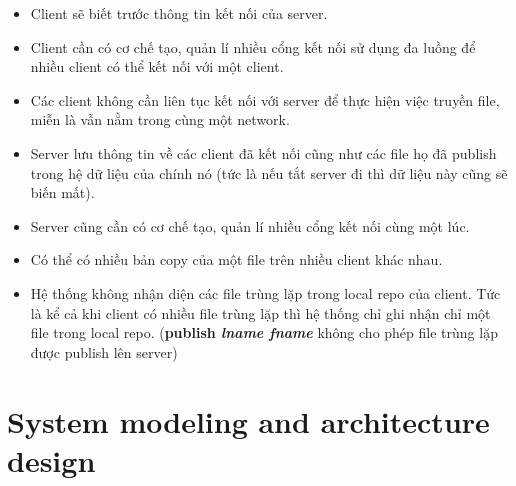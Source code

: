 \documentclass[a4paper]{article}
\begin{document}
\begin{itemize}
\begin{itemize}
		\end{itemize}
		\item Client sẽ biết trước thông tin kết nối của server.
		\item Client cần có cơ chế tạo, quản lí nhiều cổng kết nối sử dụng đa luồng để nhiều client có thể kết nối với một client.
		\item Các client không cần liên tục kết nối với server để thực hiện việc truyền file, miễn là vẫn nằm trong cùng một network.
		\item Server lưu thông tin về các client đã kết nối cũng như các file họ đã publish trong hệ dữ liệu của chính nó (tức là nếu tắt server đi thì dữ liệu này cũng sẽ biến mất).
		\item Server cũng cần có cơ chế tạo, quản lí nhiều cổng kết nối cùng một lúc.
		\item Có thể có nhiều bản copy của một file trên nhiều client khác nhau. 
		\item Hệ thống không nhận diện các file trùng lặp trong local repo của client. Tức là kể cả khi client có nhiều file trùng lặp thì hệ thống chỉ ghi nhận chỉ một file trong local repo. (\textbf{publish \textit{lname fname}} không cho phép file trùng lặp được publish lên server)
	\end{itemize}
	
	\section{System modeling and architecture design}
\end{document}

